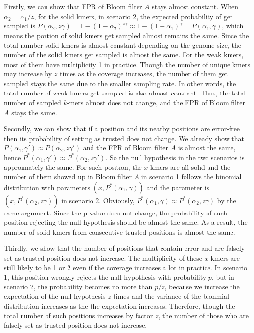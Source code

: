 \documentclass[10pt]{article}
\begin{document}
Firstly, we can show that FPR of Bloom filter $A$ stays almost constant. When $\alpha_2=\alpha_1/z$, for the solid kmers, in scenario 2, the expected probability of get sampled is $P(\alpha_2,z\gamma)=1-(1-\alpha_2)^{z\gamma}\approx 1-(1-\alpha_1)^\gamma = P(\alpha_1,\gamma)$, which means the portion of solid kmers get sampled almost remains the same. Since the total number solid kmers is almost constant depending on the genome size, the number of the solid kmers get sampled is almost the same. For the weak kmers, most of them have multiplicity 1 in practice. Though the number of unique kmers may increase by $z$ times as the coverage increases, the number of them get sampled stays the same due to the smaller sampling rate. In other words, the total number of weak kmers get sampled is also almost constant. Thus, the total number of sampled $k$-mers almost does not change, and the FPR of Bloom filter $A$ stays the same.

Secondly, we can show that if a position and its nearby positions are error-free then its probability of setting as trusted does not change. We already show that $P(\alpha_1,\gamma')\approx P(\alpha_2,z\gamma')$ and the FPR of Bloom filter $A$ is almost the same, hence $P^*(\alpha_1,\gamma')\approx P^*(\alpha_2,z\gamma')$. So the null hypothesis in the two scenarios is approimately the same. For such position, the $x$ kmers are all solid and the number of them showed up in Bloom filter $A$ in scenario 1 follows the binomial distribution with parameters $(x, P^*(\alpha_1, \gamma))$ and the parameter is $(x, P^*(\alpha_2, z\gamma))$ in scenario 2. Obviously, $P^*(\alpha_1, \gamma)\approx P^*(\alpha_2, z\gamma)$ by the same argument. Since the p-value does not change, the probability of such position rejecting the null hypothesis should be almost the same. As a result, the number of solid kmers from consecutive trusted positions is almost the same. 

Thirdly, we show that the number of positions that contain error and are falsely set as trusted position does not increase. The multiplicity of these $x$ kmers are still likely to be 1 or 2 even if the coverage increases a lot in practice. In scenario 1, this position wrongly rejects the null hypothesis with probability $p$, but in scenario 2, the probability becomes no more than $p/z$, because we increase the expectation of the null hypothesis $z$ times and the variance of the bionmial distribution increases as the the expectation increases. Therefore, though the total number of such positions increases by factor $z$, the number of those who are falsely set as trusted position does not increase.
\end{document}
